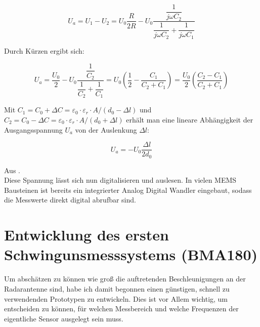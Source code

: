 \documentclass[12pt,a4paper]{scrartcl}
\begin{document}
\begin{equation}
U_a = U_1 - U_2 = U_0 \frac{R}{2 R} - U_0 \dfrac{\dfrac{1}{j \omega C_2} } { \dfrac{1} {j \omega C_2} + \dfrac{1}{j \omega C_1} }
\end{equation}

Durch Kürzen ergibt sich:

\begin{equation}
U_a = \frac{U_0}{2} - U_0 \dfrac{\dfrac{1}{C_2}}{\dfrac{1}{C_2} + \dfrac{1}{C_1}} = U_0 \left( \frac{1}{2} - \frac{C_1}{C_2 + C_1} \right) = \frac{U_0}{2} \left( \frac{C_2 - C_1}{C_2 + C_1} \right)
\end{equation}

Mit $C_1 = C_0 + \Delta C = \varepsilon _0 \cdot \varepsilon _r \cdot A / (d_0 - \Delta l )$ und $C_2 = C_0 - \Delta C = \varepsilon _0 \cdot \varepsilon _r \cdot A / (d_0 + \Delta l )$ erhält man eine lineare Abhängigkeit der Ausgangsspannung $U_a$ von der Auslenkung  $\Delta l$:

\begin{equation}
U_a = - U_0 \frac{\Delta l}{2 d_0}
\end{equation}

Aus \citep{:2002fk}.\\

Diese Spannung lässt sich nun digitalisieren und auslesen. In vielen MEMS Bausteinen ist bereits ein integrierter Analog Digital Wandler eingebaut, sodass die Messwerte direkt digital abrufbar sind. 

\newpage

\section{Entwicklung des ersten Schwingunsmesssystems (BMA180)}

Um abschätzen zu können wie groß die auftretenden Beschleunigungen an der Radarantenne sind, habe ich damit begonnen einen günstigen, schnell zu verwendenden Prototypen zu entwickeln. Dies ist vor Allem wichtig, um entscheiden zu können, für welchen Messbereich und welche Frequenzen der eigentliche Sensor ausgelegt sein muss. \\
\end{document}
